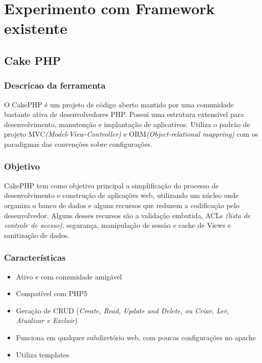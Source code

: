 \chapter{Experimento com Framework existente\label{cap:experimento}}

    \section{Cake PHP\label{sec:cake-php}}
        \subsection{Descricao da ferramenta\label{sub:descricao-cake}}

            O CakePHP é um projeto de código aberto mantido por uma comunidade bastante ativa de desenvolvedores PHP. Possui uma estrutura extensível para desenvolvimento, manutenção e implantação de aplicativos. Utiliza o padrão de projeto MVC\emph{(Model-View-Controller)} e ORM\emph{(Object-relational mappring)} com os paradigmas das convenções sobre configurações.


        \subsection{Objetivo\label{sub:objetivo-cake}}

            CakePHP tem como objetivo principal a simplificação do processo de desenvolvimento e construção de aplicações web, utilizando um núcleo onde organiza o banco de dados e alguns recursos que reduzem a codificação pelo desenvolvedor. Alguns desses recursos são a validação embutida, ACLs \emph{(lista de controle de acesso)}, segurança, manipulação de sessão e cache de Views e sanitização de dados.


        \subsection{Características\label{sub:caracteristicas-cake}}
            \begin{itemize}
                \item Ativo e com comunidade amigável
                \item Compatível com PHP5
                \item Geração de CRUD (\emph{Create, Read, Update and Delete, ou Criar, Ler, Atualizar e Excluir})
                \item Funciona em qualquer subdiretório web, com poucas configurações no apache
                \item Utiliza templates
            \end{itemize}
